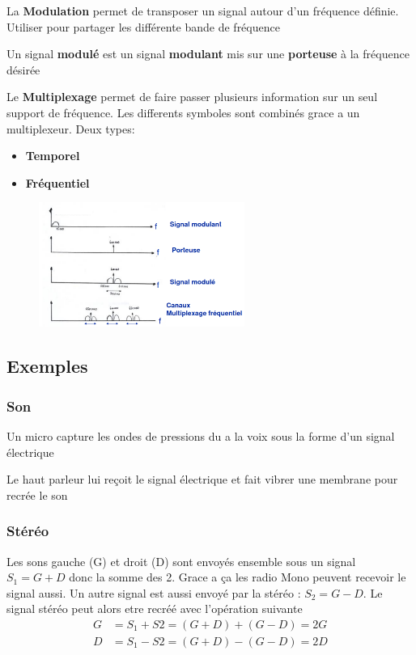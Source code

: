 		La \textbf{Modulation} permet de transposer un signal autour d'un fréquence définie. Utiliser pour partager les différente bande de fréquence
		
		Un signal \textbf{modulé} est un signal \textbf{modulant} mis sur une \textbf{porteuse} à la fréquence désirée
		
		Le \textbf{Multiplexage} permet de faire passer plusieurs information sur un seul support de fréquence. Les differents symboles sont combinés grace a un multiplexeur. Deux types:
		\begin{itemize}
			\item \textbf{Temporel}
			\item \textbf{Fréquentiel}
		\end{itemize}
		\begin{figure}[htp]
			\centering
			\includegraphics[width=0.6\textwidth]{img/Multiplexage.png}
		\end{figure}
	\subsection{Exemples}
		\subsubsection{Son}
			Un micro capture les ondes de pressions du a la voix sous la forme d'un signal électrique
			
			Le haut parleur lui reçoit le signal électrique et fait vibrer une membrane pour recrée le son
			
			
		\subsubsection{Stéréo}
		
			Les sons gauche (G) et droit (D) sont envoyés ensemble sous un signal $S_1 = G+D$ donc la somme des 2. Grace a ça les radio Mono peuvent recevoir le signal aussi. Un autre signal est aussi envoyé par la stéréo : $S_2 = G-D$. Le signal stéréo peut alors etre recréé avec l'opération suivante
			\begin{align*} 
				G &=  S_1 + S2 = (G+D) + (G-D) = 2G \\ 		
				D &=  S_1 - S2 = (G+D) - (G-D) = 2D
			\end{align*}
		
